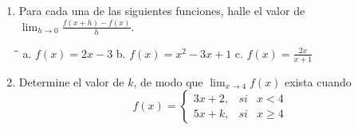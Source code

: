 \documentclass[10pt]{article}
\newcommand{\2}[1]{\hspace{-0.93cm}\colorbox{color1}{\hspace{0.07cm} \parbox{17cm}{\vspace{0.2cm} #1}\hspace*{0.07cm} }}
\newcommand{\3}[1]{\hspace{-0.93cm}\colorbox{color7}{\hspace{0.07cm} \parbox{17cm}{\vspace{0.2cm} #1}\hspace*{0.07cm} }}
\theoremstyle{theorem}
\numberwithin{equation}{section}
\newcommand{\dis}{\displaystyle}
\begin{document}
\begin{enumerate}[P1.]
  \item Para cada una de las siguientes funciones, halle el valor de $\dis \lim_{h\to 0}\frac{f(x+h)-f(x)}{h}$.
  \begin{tabbing}
\hspace{5 cm}\=\hspace{5 cm}\=\kill
 a.  $f(x)=2x-3$ \>  b.  $f(x)=x^2-3x+1$ \> c.  $\dis f(x)=\frac{2x}{x+1}$\\   
\end{tabbing}
  \item Determine el valor de $k$, de modo que $\dis \lim_{x\to 4}f(x)$ exista cuando $$f(x)=\left\lbrace  \begin{array}{ccc}
3x+2,&si& x< 4\\ 5x+k  ,&si& x\geq 4 
\end{array}        \right.$$ 
\end{enumerate}
\end{document}
